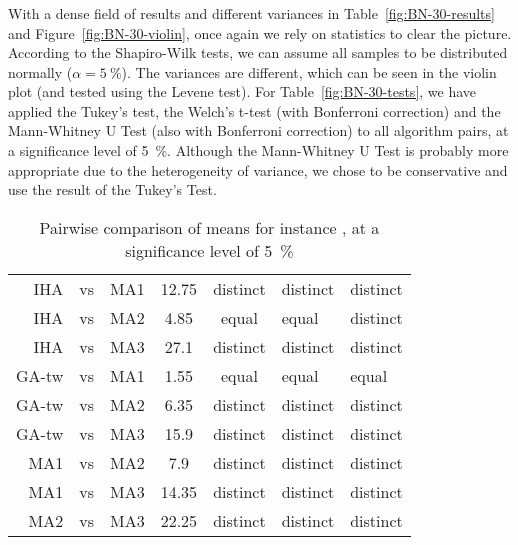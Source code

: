 \documentclass[thesis.tex]{subfiles}
\begin{document}
\subsubsection{}
   \renewcommand{\CurrentInstance}{\Instance{BN\textunderscore{}30}}
   \renewcommand{\CurrentInstanceFileEscaped}{BN-30}
   \renewcommand{\CurrentInstanceTexEscaped}{BN\textunderscore{}30}



With a dense field of results and different variances in Table~\vref{fig:BN-30-results} and Figure~\vref{fig:BN-30-violin}, once again we rely on statistics to clear the picture. According to the Shapiro-Wilk tests, we can assume all samples to be distributed normally ($\alpha = \SI{5}{\percent}$). The variances are different, which can be seen in the violin plot (and tested using the Levene test). For Table~\vref{fig:BN-30-tests}, we have applied the Tukey's test, the Welch's t-test (with Bonferroni correction) and the Mann-Whitney U Test (also with Bonferroni correction) to all algorithm pairs, at a significance level of \SI{5}{\percent}. Although the Mann-Whitney U Test is probably more appropriate due to the heterogeneity of variance, we chose to be conservative and use the result of the Tukey's Test.
\begin{table}[htbp]
   \caption{Pairwise comparison of means for instance \CurrentInstance, at a significance level of \SI{5}{\percent}}
   \label{fig:\CurrentInstanceFileEscaped-tests}
   \centering\small
      \begin{tabular}{r@{\ }c@{\ }l S[table-format=2.2] c >{\centering\arraybackslash}p{7em} >{\centering\arraybackslash}p{9em}} \toprule
         &&&  &  &  & \\ \midrule

         \gls{IHA} &vs& \gls{MA1}   & 12.75 & distinct & distinct & distinct \\
         \gls{IHA} &vs& \gls{MA2}   &  4.85 &  equal   &  equal   & distinct \\
         \gls{IHA} &vs& \gls{MA3}   & 27.1  & distinct & distinct & distinct \\
         \gls{GA-tw} &vs& \gls{MA1} &  1.55 &  equal   &  equal   &  equal   \\
         \gls{GA-tw} &vs& \gls{MA2} &  6.35 & distinct & distinct & distinct \\
         \gls{GA-tw} &vs& \gls{MA3} & 15.9  & distinct & distinct & distinct \\
         \gls{MA1} &vs& \gls{MA2}   &  7.9  & distinct & distinct & distinct \\
         \gls{MA1} &vs& \gls{MA3}   & 14.35 & distinct & distinct & distinct \\
         \gls{MA2} &vs& \gls{MA3}   & 22.25 & distinct & distinct & distinct \\
         \bottomrule
      \end{tabular}
\end{table}
\end{document}
